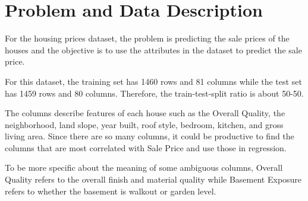 \documentclass[fleqn,10pt]{SelfArx} %
\affiliation{\textsuperscript{1}\textit{Computer Science, School of Informatics , Computing and Engineering, Indiana University, Bloomington, IN, USA}} %
\begin{document}
\flushbottom %

\maketitle %

\tableofcontents %

\thispagestyle{empty} %






\section{Problem and Data Description} %

For the housing prices dataset, the problem is predicting the sale prices of the houses and the objective is to use the attributes in the dataset to predict the sale price. 

For this dataset, the training set has 1460 rows and 81 columns while the test set has 1459 rows and 80 columns. Therefore, the train-test-split ratio is about 50-50. 

The columns describe features of each house such as the Overall Quality, the neighborhood, land slope, year built, roof style, bedroom, kitchen, and gross living area. Since there are so many columns, it could be productive to find the columns that are most correlated with Sale Price and use those in regression. 

To be more specific about the meaning of some ambiguous columns, Overall Quality refers to the overall finish and material quality while Basement Exposure refers to whether the basement is walkout or garden level. 

\bigskip
\bigskip

\end{document}

